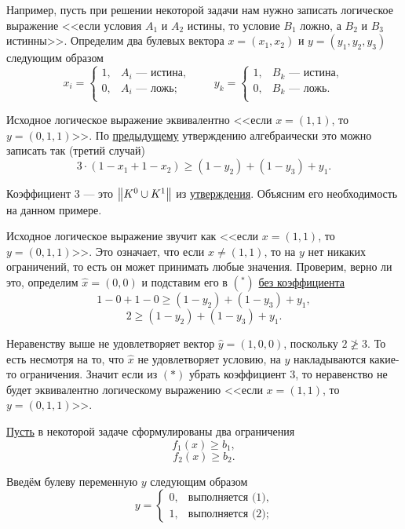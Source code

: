 Например, пусть при решении некоторой задачи нам нужно записать логическое выражение <<если условия $A_1$ и $A_2$ истины, то условие $B_1$ ложно, а $B_2$ и $B_3$ истинны>>. Определим два булевых вектора $x = (x_1, x_2)$ и $y = (y_1, y_2, y_3)$ следующим образом
\[
x_i = \begin{cases}
	1,& \text{$A_i$ --- истина},\\
	0,& \text{$A_i$ --- ложь};\\
\end{cases} \qquad y_k = \begin{cases}
1,& \text{$B_k$ --- истина},\\
0,& \text{$B_k$ --- ложь}.\\
\end{cases}
\]

Исходное логическое выражение эквивалентно <<если $x = (1, 1)$, то $y = (0, 1, 1)$>>. По \hyperref[fact:complex_conditions]{предыдущему} утверждению алгебраически это можно записать так (третий случай)
\[
\boxed{3 \cdot (1 - x_1 + 1 - x_2) \ge (1 - y_2) + (1 - y_3) + y_1}\tag{*}.
\]

Коэффициент $3$ --- это $\norm{K^0 \cup K^1}$ из \hyperref[fact:complex_conditions]{утверждения}. Объясним его необходимость на данном примере.

Исходное логическое выражение звучит как <<если $x = (1, 1)$, то $y = (0, 1, 1)$>>. Это означает, что если $x \neq (1, 1)$, то на $y$ нет никаких ограничений, то есть он может принимать любые значения. Проверим, верно ли это, определим $\hat{x} = (0, 0)$ и подставим его в $(^*)$ \underline{без коэффициента}
\[
1 - 0 + 1 - 0 \ge (1 - y_2) + (1 - y_3) + y_1,
\]
\[
2 \ge (1 - y_2) + (1 - y_3) + y_1.
\]

Неравенству выше не удовлетворяет вектор $\hat{y} = (1, 0, 0)$, поскольку $2 \ngeq 3$. То есть несмотря на то, что $\hat{x}$ не удовлетворяет условию, на $y$ накладываются какие-то ограничения. Значит если из $(*)$ убрать коэффициент $3$, то неравенство не будет эквивалентно логическому выражению <<если $x = (1, 1)$, то $y = (0, 1, 1)$>>.

\label{fact:alternative_conditions}

\underline{Пусть} в некоторой задаче сформулированы два ограничения
\[f_1(x) \ge b_1, \tag{1}\]
\[f_2(x) \ge b_2. \tag{2}\]

Введём булеву переменную $y$ следующим образом
\[
y = \begin{cases}
	0,& \text{выполняется (1)},\\
	1,&\text{выполняется (2)};
\end{cases}
\]

